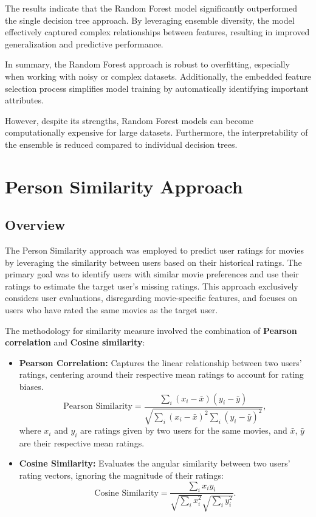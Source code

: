 \documentclass[a3paper,12pt]{article}
\begin{document}
The results indicate that the Random Forest model significantly outperformed the
single decision tree approach.
By leveraging ensemble diversity, the model effectively captured complex relationships
between features, resulting in improved generalization and predictive performance.

In summary, the Random Forest approach is robust to overfitting,
especially when working with noisy or complex datasets.
Additionally, the embedded feature selection process simplifies model training
by automatically identifying important attributes.

However, despite its strengths, Random Forest models can become computationally expensive for large datasets.
Furthermore, the interpretability of the ensemble is reduced compared to individual decision trees.

\section{Person Similarity Approach}
\subsection{Overview}
The Person Similarity approach was employed to predict user ratings for movies by leveraging the similarity
between users based on their historical ratings.
The primary goal was to identify users with similar movie preferences and use their ratings to estimate
the target user's missing ratings.
This approach exclusively considers user evaluations, disregarding movie-specific features, and focuses
on users who have rated the same movies as the target user.

The methodology for similarity measure involved the combination of \textbf{Pearson correlation} and \textbf{Cosine similarity}:

\begin{itemize}
    \item \textbf{Pearson Correlation:} Captures the linear relationship between two users' ratings, centering around their respective mean ratings to account for rating biases.
    \begin{equation}
        \text{Pearson Similarity} = \frac{\sum_{i} (x_i - \bar{x})(y_i - \bar{y})}{\sqrt{\sum_{i} (x_i - \bar{x})^2 \sum_{i} (y_i - \bar{y})^2}},
    \end{equation}
    where \( x_i \) and \( y_i \) are ratings given by two users for the same movies, and \( \bar{x} \), \( \bar{y} \) are their respective mean ratings.

    \item \textbf{Cosine Similarity:} Evaluates the angular similarity between two users' rating vectors, ignoring the magnitude of their ratings:
    \begin{equation}
        \text{Cosine Similarity} = \frac{\sum_{i} x_i y_i}{\sqrt{\sum_{i} x_i^2} \sqrt{\sum_{i} y_i^2}}.
    \end{equation}
\end{itemize}
\end{document}
